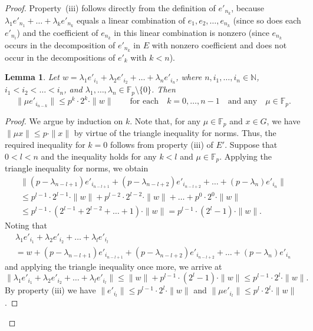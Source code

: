 \documentclass[12pt,a4paper]{amsart}
\newtheorem{lemma}{Lemma}
\theoremstyle{definition}
\begin{document}
\begin{proof}
Property~(iii) follows directly from the definition of $e'_{n_k}$, because  
$\lambda_1 e'_{n_1}+\dots +\lambda_k e'_{n_k}$ equals a linear 
combination of $e_1, e_2, \dots, e_{n_k}$ (since so does each $e'_{n_i}$) and the coefficient of $e_{n_k}$ 
in this linear combination is nonzero (since $e_{n_k}$ occurs in the decomposition of $e'_{n_k}$ in 
$E$ with nonzero coefficient and does not occur in the decompositions of $e'_k$ with $k<n$). 

\begin{lemma}
\label{l1}
Let $w=\lambda_1 e'_{i_1} + \lambda_2 e'_{i_2} +\dots + \lambda_n e'_{i_n}$\textup, 
where $n, i_1, \dots, i_n\in \mathbb N$\textup, $i_1< i_2< \dots < i_n$\textup, and $\lambda_1, \dots, 
\lambda_n\in \mathbb F_p\setminus \{0\}$\textup. Then 
$$ 
\|\mu e'_{i_{n-k}}\|\le p^k\cdot 2^k\cdot \|w\|\qquad \text{for each}\quad k=0, \dots, n-1\quad \text{and 
any}\quad \mu\in \mathbb F_p. 
$$ 
\end{lemma}

\begin{proof}
We argue by induction on $k$. Note that, for any $\mu \in \mathbb F_p$ and $x\in G$, we have $\|\mu x\|\le p\cdot 
\|x\|$ by virtue of the triangle inequality for norms. Thus, the required inequality for $k=0$ follows from property (iii) of $E'$. Suppose that 
$0<l<n$ and the inequality holds for any $k<l$ and $\mu\in \mathbb F_p$. Applying the triangle inequality for 
norms, we obtain 
\begin{multline*}
\|(p-\lambda_{n-l+1})e'_{i_{n-l+1}}+(p-\lambda_{n-l+2})e'_{i_{n-l+2}}+\dots +(p-\lambda_{n})e'_{i_{n}}\| \\
\le p^{l-1}\cdot 2^{l-1}\cdot\|w\|+ p^{l-2}\cdot 2^{l-2}\cdot\|w\|+\dots+p^0\cdot 2^0\cdot\|w\|\\
\le p^{l-1}\cdot (2^{l-1}+2^{l-2}+\dots+1)\cdot\|w\|= p^{l-1}\cdot (2^l-1)\cdot \|w\|. 
\end{multline*}
Noting that 
\begin{multline*}
\lambda_1 e'_{i_{1}}+\lambda_2 e'_{i_{2}}+\dots +\lambda_l e'_{i_{l}}  \\ = w + 
(p-\lambda_{n-l+1})e'_{i_{n-l+1}}+(p-\lambda_{n-l+2})e'_{i_{n-l+2}}+\dots +(p-\lambda_{n})e'_{i_{n}}
\end{multline*}
and 
applying the triangle inequality once more, we arrive at 
$$
\|\lambda_1 e'_{i_{1}}+\lambda_2 e'_{i_{2}}+\dots +\lambda_l e'_{i_{l}}\|\le 
\|w\|+ p^{l-1}\cdot (2^l-1)\cdot \|w\| \le p^{l-1}\cdot 2^l\cdot\|w\|. 
$$
By property (iii) we have $\|e'_{i_{l}}\|\le p^{l-1}\cdot 2^l\cdot\|w\|$ and $\|\mu e'_{i_{l}}\|\le p^l \cdot 
2^l\cdot\|w\|$. 
\end{proof}


\end{proof}
\end{document}
